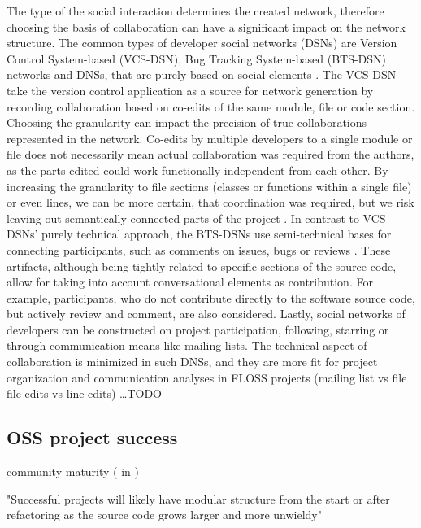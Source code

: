The type of the social interaction determines the created network, therefore choosing the basis of collaboration can have a significant impact on the network structure. The common types of developer social networks (DSNs) are Version Control System-based (VCS-DSN), Bug Tracking System-based (BTS-DSN) networks and DNSs, that are purely based on social elements \cite{aljemabiEmpiricalStudyEvolution2018}. The VCS-DSN take the version control application as a source for network generation by recording collaboration based on co-edits of the same module, file or code section. Choosing the granularity can impact the precision of true collaborations represented in the network. Co-edits by multiple developers to a single module or file does not necessarily mean actual collaboration was required from the authors, as the parts edited could work functionally independent from each other. By increasing the granularity to file sections (classes or functions within a single file) or even lines, we can be more certain, that coordination was required, but we risk leaving out semantically connected parts of the project \cite{joblinEvolutionaryTrendsDeveloper2017}. In contrast to VCS-DSNs' purely technical approach, the BTS-DSNs use semi-technical bases for connecting participants, such as comments on issues, bugs or reviews \cite{elasriPeripheryCoreTemporal2017}. These artifacts, although being tightly related to specific sections of the source code, allow for taking into account conversational elements as contribution. For example, participants, who do not contribute directly to the software source code, but actively review and comment, are also considered. Lastly, social networks of developers can be constructed on project participation, following, starring or through communication means like mailing lists. The technical aspect of collaboration is minimized in such DNSs, and they are more fit for project organization and communication analyses in FLOSS projects (mailing list vs file file edits vs line edits) \dots TODO

\subsection{OSS project success}
community maturity (\cite{linBlogCommunityDiscovery2007} in \cite{aljemabiEmpiricalStudyEvolution2018})

"Successful projects will likely have modular structure from the start or after refactoring as the source code grows larger and more unwieldy" \cite{antwerpEvolutionOpenSource2010}

